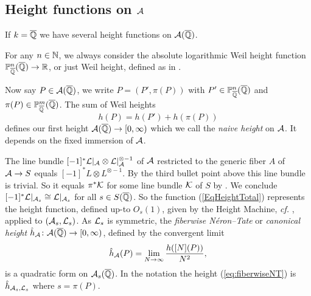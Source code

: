 \subsection{Height functions on $\mathcal{A}$}\label{SubsectionHeight}
If $k={\overline{\mathbb{Q}}}$ we have several height functions on $\mathcal{A}({\overline{\mathbb{Q}}})$.

For any $n \in {\mathbb{N}}$, we always consider the absolute logarithmic 
Weil height function ${\mathbb{P}}_{{\overline{\mathbb{Q}}}}^n({\overline{\mathbb{Q}}}) \rightarrow {\mathbb{R}}$, or just 
Weil height, defined as in \cite[$\mathsection$1.5.1]{BG}.

Now say $P\in \mathcal{A}({\overline{\mathbb{Q}}})$, we write $P=(P',\pi(P))$ with
$P'\in {\mathbb{P}}_{{\overline{\mathbb{Q}}}}^n({\overline{\mathbb{Q}}})$ and
$\pi(P)\in {\mathbb{P}}_{{\overline{\mathbb{Q}}}}^m({\overline{\mathbb{Q}}})$. The sum of
Weil heights
\begin{equation}\label{EqHeightTotal}
h(P) = h(P') + h(\pi(P))
\end{equation}
defines our first height $\mathcal{A}({\overline{\mathbb{Q}}})\rightarrow [0,\infty)$ which we
call the \textit{naive height} on $\mathcal{A}$. It depends on the fixed
immersion of $\mathcal{A}$.

The line bundle $[-1]^*{\mathcal L}|_{\mathcal{A}} \otimes{\mathcal L}|_{\mathcal{A}}^{\otimes -1}$ of
${\mathcal{A}}$ restricted to the generic fiber $A$ of $\mathcal{A}\rightarrow S$
equals $[-1]^*L \otimes L^{\otimes -1}$. By the third bullet point above this line
bundle is trivial. So it equals $\pi^*{\mathcal K}$ for some line bundle ${\mathcal K}$
of $S$ by \cite[Corollaire~21.4.13 (pp.~361 of EGA IV-4, in Errata et Addenda, liste~3)]{EGAIV}. We conclude
$[-1]^*{\mathcal L}|_{\mathcal{A}_s}\cong {\mathcal L}|_{\mathcal{A}_s}$ for all $s\in S({\overline{\mathbb{Q}}})$. So
the function (\ref{EqHeightTotal}) represents the height function,
defined up-to $O_s(1)$, given by the Height
Machine, \textit{cf.} \cite[Theorem 2.3.8]{BG}, applied to
$(\mathcal{A}_s,{\mathcal L}_s)$. As ${\mathcal L}_s$ is symmetric, the \textit{fiberwise
N\'eron--Tate} or \textit{canonical height} $\hat
h_{\mathcal{A}} \colon \mathcal{A}({\overline{\mathbb{Q}}})\rightarrow [0,\infty)$, defined by the
convergent limit
\begin{equation}
\label{eq:fiberwiseNT}
\hat h_{\cA}(P) = \lim_{N\rightarrow\infty} \frac{h([N](P))}{N^2},%
\end{equation}
is a quadratic form on $\mathcal{A}_s({\overline{\mathbb{Q}}})$. In the notation \cite[Chapter~9]{BG} the height
(\ref{eq:fiberwiseNT}) is $\hat h_{\mathcal{A}_s,{\mathcal L}_s}$ where $s=\pi(P)$. 


